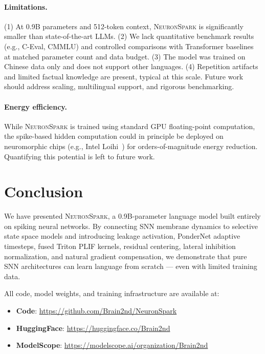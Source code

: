 \documentclass[10pt,twocolumn]{article}
\newcommand{\model}{\textsc{NeuronSpark}}
\begin{document}
\paragraph{Limitations.}
(1) At 0.9B parameters and 512-token context, \model{} is significantly smaller than state-of-the-art LLMs.
(2) We lack quantitative benchmark results (e.g., C-Eval, CMMLU) and controlled comparisons with Transformer baselines at matched parameter count and data budget.
(3) The model was trained on Chinese data only and does not support other languages.
(4) Repetition artifacts and limited factual knowledge are present, typical at this scale.
Future work should address scaling, multilingual support, and rigorous benchmarking.

\paragraph{Energy efficiency.}
While \model{} is trained using standard GPU floating-point computation, the spike-based hidden computation could in principle be deployed on neuromorphic chips (e.g., Intel Loihi~\citep{davies2018loihi}) for orders-of-magnitude energy reduction.
Quantifying this potential is left to future work.


\section{Conclusion}
\label{sec:conclusion}

We have presented \model{}, a 0.9B-parameter language model built entirely on spiking neural networks.
By connecting SNN membrane dynamics to selective state space models and introducing leakage activation, PonderNet adaptive timesteps, fused Triton PLIF kernels, residual centering, lateral inhibition normalization, and natural gradient compensation, we demonstrate that pure SNN architectures can learn language from scratch --- even with limited training data.

All code, model weights, and training infrastructure are available at:
\begin{itemize}
    \item \textbf{Code}: \url{https://github.com/Brain2nd/NeuronSpark}
    \item \textbf{HuggingFace}: \url{https://huggingface.co/Brain2nd}
    \item \textbf{ModelScope}: \url{https://modelscope.ai/organization/Brain2nd}
\end{itemize}
\end{document}
